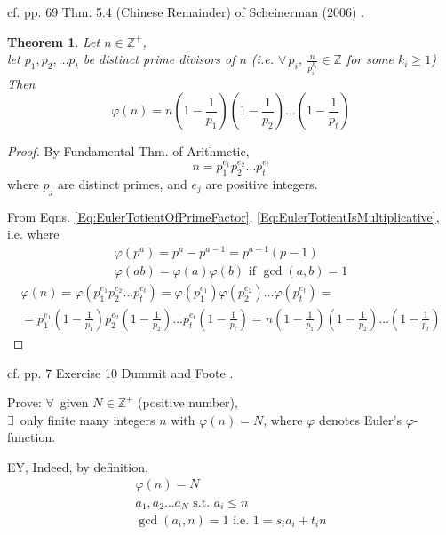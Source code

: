 \documentclass[10pt]{amsart}
\newtheorem{theorem}{Theorem}
\newcommand{\exercisehead}[1]
  { \smallskip
   \noindent{\small\bf Exercise #1.}
  }
\begin{document}
\begin{multicols*}{2}
cf. pp. 69 Thm. 5.4 (Chinese Remainder) of Scheinerman (2006) \cite{Sche2006}.  
\begin{theorem}
	Let $n\in \mathbb{Z}^+$, \\
	let $p_1,p_2, \dots p_t$ be distinct prime divisors of $n$ (i.e. $\forall \, p_i$, $\frac{n}{p_i^{k_i}} \in \mathbb{Z}$ for some $k_i \geq 1$) \\
	Then
	\begin{equation}
	\varphi(n) = n\left( 1 - \frac{1}{p_1} \right)\left( 1- \frac{1}{p_2} \right) \ldots \left( 1 - \frac{1}{p_t} \right) 	
	\end{equation}
\end{theorem}

\begin{proof}
	By Fundamental Thm. of Arithmetic, 
	\[
	n = p_1^{e_1} p_2^{e_2} \dots p_t^{e_t} 
	\]
	where $p_j$ are distinct primes, and $e_j$ are positive integers.  
	
	From Eqns. \ref{Eq:EulerTotientOfPrimeFactor}, \ref{Eq:EulerTotientIsMultiplicative}, i.e. where 
	\[
	\begin{gathered}
	\varphi(p^a) = p^a - p^{a-1} = p^{a-1} (p-1) \\
	\varphi(ab) = \varphi(a) \varphi(b)  \text{ if } \gcd(a,b) = 1
		\end{gathered}
		\]
		\[
		\begin{gathered}
	\varphi(n) = \varphi(p_1^{e_1}p_2^{e_2} \dots p_t^{e_t}) = \varphi(p_1^{e_1}) \varphi(p_2^{e_2}) \dots \varphi(p_t^{e_t}) = \\
	= p_1^{e_1} (1- \frac{1}{p_1} )p_2^{e_2} (1- \frac{1}{p_2} ) \dots p_t^{e_t} (1- \frac{1}{p_t} ) = n(1- \frac{1}{p_1}) (1- \frac{1}{p_2}) \dots (1- \frac{1}{p_t})
		\end{gathered}
		\]
	\end{proof}


\exercisehead{10}
cf. pp. 7 Exercise 10 Dummit and Foote \cite{DuFo2003}.  

Prove: $\forall \, $ given $N \in \mathbb{Z}^+$ (positive number), \\
$\exists \, $ only finite many integers $n$ with $\varphi(n) = N$, where $\varphi$ denotes Euler's $\varphi$-function.  

EY, Indeed, by definition, \\
\[
\begin{gathered}
\varphi(n) = N \\
a_1, a_2 \dots a_N \text{ s.t. } a_i \leq n \\
\gcd(a_i,n)=1 \text{ i.e. } 1 = s_i a_i + t_i n 
\end{gathered}
\]



\end{multicols*}
\end{document}
